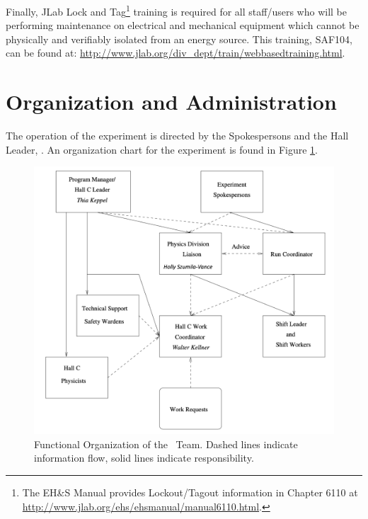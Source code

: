 \documentclass[10pt]{article}
\begin{document}
Finally, JLab Lock and Tag\footnote{The EH\&S Manual provides Lockout/Tagout
information in Chapter 6110 at \url{http://www.jlab.org/ehs/ehsmanual/manual6110.html}.}
training is required for all staff/users who will be
performing maintenance on electrical and mechanical equipment which
cannot be physically and verifiably isolated from an energy
source.   This training, SAF104, can be found at:   \newline
\url{http://www.jlab.org/div_dept/train/webbasedtraining.html}.



\section{ Organization  and Administration}

The operation of the experiment is directed by the Spokespersons and the Hall
Leader, \HALLLEADER. An organization chart for the experiment is
found in Figure \ref{HALLCHART}.

\begin{figure}
\includegraphics[width=\textwidth]{coo_HallCorg}
%
%
%
%
\caption[Dummy caption.]{Functional Organization of the \HALL\ Team. Dashed
lines indicate information flow, solid lines indicate responsibility.}
\label{HALLCHART}
\end{figure}
\end{document}
